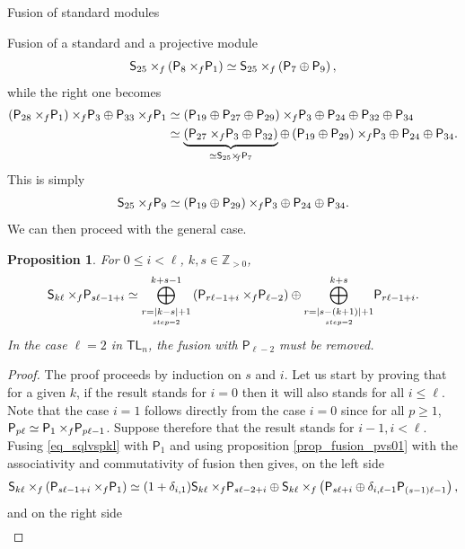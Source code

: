 \documentclass[reqno]{amsart}
\newtheorem{Prop}[Thm]{Proposition}
\newcommand{\tl}[1]{\mathsf{TL}_{#1}}
\newcommand{\ds}[1]{\mathsf S_{#1}}
\newcommand{\dP}[1]{\mathsf P_{#1}}
\newcommand{\xf}{\times\hspace{-0.27em}_f}
\newcommand{\lc}{\ell}
\begin{document}
\begin{section}{Fusion of standard modules}
\begin{subsection}{Fusion of a standard and a projective module}
\begin{equation}
	\ds{25} \xf \left(\dP{8} \xf \dP{1}\right) \simeq \ds{25} \xf \left( \dP{7} \oplus \dP{9}\right),
\end{equation}
while the right one becomes
\begin{align}
	\left(\dP{28} \xf \dP{1} \right)\xf \dP{3} \oplus \dP{33}\xf \dP{1} &\simeq \left(\dP{19} \oplus \dP{27} \oplus \dP{29} \right)\xf \dP{3} \oplus \dP{24} \oplus \dP{32} \oplus \dP{34}\\
	& \simeq \underbrace{\left(\dP{27} \xf \dP{3} \oplus \dP{32} \right)}_{\simeq \ds{25} \xf \dP{7}} \oplus \left(\dP{19}\oplus \dP{29}\right)\xf \dP{3} \oplus \dP{24} \oplus \dP{34}.
\end{align}
This is simply
\begin{equation}
\ds{25} \xf \dP{9} \simeq (\dP{19} \oplus \dP{29}) \xf \dP{3} \oplus \dP{24} \oplus \dP{34} \text{.}
\end{equation}
We can then proceed with the general case.
\begin{Prop}\label{prop_fusion_sqlvspkl}
For $0\leq i<\lc$, $k,s \in \mathbb{Z}_{>0}$,
\begin{equation}\label{eq_sqlvspkl}
\ds{k \lc } \xf \dP{s \lc -1+i} \simeq \overset{k+s-1}{\underset{\underset{step =2}{r = |k-s| + 1}}{\bigoplus}}\left( \dP{r \lc -1+i} \xf \dP{\lc-2}\right) \oplus \overset{k+s}{\underset{\underset{step =2}{r = |s-(k+1)| + 1}}{\bigoplus}} \dP{r \lc -1+i} \text{.}
\end{equation}
In the case $\lc =2$ in $\tl{n}$, the fusion with $\dP{\lc-2}$ must be removed.
\end{Prop}
\begin{proof}
The  proof proceeds by induction on $s$ and $i$. Let us start by proving that for a given $k$, if the result stands for $i=0$ then it will also stands for all $i \leq \lc$. Note that the case $i=1$ follows directly from the case $i=0$ since for all $p\geq 1$, $\dP{p \lc} \simeq \dP{1} \xf \dP{p \lc -1}$. Suppose therefore that the result stands for $i-1, i<\lc$. Fusing \eqref{eq_sqlvspkl} with $\dP{1}$ and using proposition \ref{prop_fusion_pvs01} with the associativity and commutativity of fusion then gives, on the left side
%
%
\begin{equation}
	\ds{k \lc} \xf \left(\dP{s \lc -1 +i}\xf \dP{1} \right) \simeq (1+\delta_{i,1})\ds{k \lc} \xf \dP{s \lc -2 +i} \oplus \ds{k \lc} \xf \left(\dP{s \lc +i} \oplus \delta_{i,\lc-1} \dP{(s-1)\lc -1}\right),
\end{equation}
and on the right side
\begin{align*}

\end{align*}
\end{proof}
\end{subsection}
\end{section}
\end{document}
